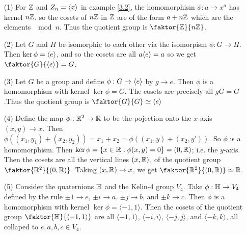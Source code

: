 \begin{example}\label{example_3.2}
  \begin{enumerate}
    \item[(1)] For $\mathbb{Z}$ and  $Z_n=\langle x\rangle$ in example \ref {3.2}, the
      homomorphism $\phi:a \rightarrow x^a$ has kernel $n\mathbb{Z}$, so the
      cosets of  $n\mathbb{Z}$ in  $\mathbb{Z}$ are of the form  $a+n\mathbb{Z}$ which are the
      elements $\mod{n}$. Thus the quotient group is $\faktor{\Z}{n\Z}$.

    \item[(2)] Let $G$ and  $H$ be isomorphic to each other via the
      isomorpism  $\phi:G \rightarrow H$. Then $\ker{\phi}=\langle e\rangle$,
      and so the cosets are all $a\langle e\rangle=a$ so we get
      $\faktor{G}{\vbrack{e}}=G$.

    \item[(3)] Let $G$ be a group and define  $\phi:G \rightarrow
      \langle e\rangle$ by $g \rightarrow e$. Then $\phi$ is a homomorphism with
      kernel $\ker{\phi}=G$. The cosets are precisely all $gG=G$.Thus
      the quotient group is $\faktor{G}{G} \simeq \vbrack{e}$

    \item[(4)] Define the map $\phi:\mathbb{R}^2 \rightarrow \mathbb{R}$ to be the
      pojection onto the $x$-axis $(x,y) \rightarrow x$. Then
      $\phi((x_1,y_1)+(x_2,y_2))=x_1+x_2=\phi((x_1,y)+(x_2,y'))$. So
      $\phi$ is a homomorphism. Then $\ker{\phi}=\{x \in \mathbb{R} :
      \phi(x,y)=0\}=(0,\mathbb{R})$; i.e. the $y$-axis. Then the cosets are all
      the vertical lines $(x,\mathbb{R})$, of the quotient group
      $\faktor{\R^2}{(0,\R)}$. Taking $(x,\mathbb{R}) \rightarrow x$, we get
      $\faktor{\R^2}{(0,\R)} \simeq \R$.

    \item[(5)] Consider the quaternions $\mathbb{H}$ and the Kelin-$4$ group  $V_4$.
      Take  $\phi:\mathbb{H} \rightarrow V_4$ defined by the rule $\pm 1
      \rightarrow e$, $\pm i \rightarrow a$, $\pm j \rightarrow b$, and
      $\pm k \rightarrow c$. Then  $\phi$ is a homomorphism with kernel
      $\ker{\phi}=\langle -1 ,1 \rangle$. Then the cosets of the quotient group
      $\faktor{\Hb}{\langle -1, 1 \rangle}$ are all $\langle -1 ,1 \rangle$,
      $\langle -i, i \rangle$, $\langle -j, j \rangle$, and  $\langle
      -k, k \rangle$, all
      collaped to  $e,a,b,c \in V_4$.
  \end{enumerate}
\end{example}
